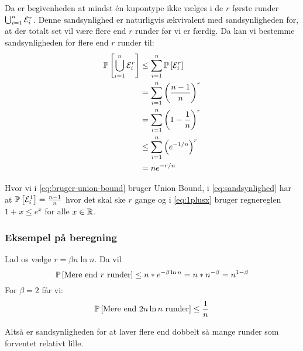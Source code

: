 Da er begivenheden at mindst én kupontype ikke vælges i de $r$ første runder $\bigcup_{i=1}^n \event_i^r$. Denne sandsynlighed er naturligvis ækvivalent med sandsynligheden for, at der totalt set vil være flere end $r$ runder før vi er færdig. Da kan vi bestemme sandsynligheden for flere end $r$ runder til:
\begin{align}
  \P{\bigcup_{i=1}^n \event_i^r}
  &\leq \sum_{i=1}^n \P{\event_i^r} \label{eq:bruger-union-bound} \\
  &= \sum_{i=1}^n \pfrac{n-1}{n}^r \label{eq:sandsynlighed} \\
  &= \sum_{i=1}^n \p{1 - \frac{1}{n}}^r \nonumber \\
  &\leq \sum_{i=1}^n \p{e^{-1/n}}^r \label{eq:1plusx}\\
  &= n e^{-r/n} \nonumber
\end{align}

Hvor vi i \cref{eq:bruger-union-bound} bruger Union Bound, i \cref{eq:sandsynlighed} har at $\P{\event_i^1} = \frac{n-1}{n}$ hvor det skal ske $r$ gange og i \cref{eq:1plusx} bruger regnereglen $1 + x \leq e^x$ for alle $x \in \R$.


\subsubsection{Eksempel på beregning}
Lad os vælge $r = \beta n \ln n$. Da vil
$$
\P{\text{Mere end $r$ runder}} \leq n * e^{- \beta \ln n} = n * n^{- \beta} = n^{1 - \beta}
$$
For $\beta = 2$ får vi:
$$
\P{\text{Mere end $2 n \ln n$ runder}} \leq \frac{1}{n}
$$

Altså er sandsynligheden for at laver flere end dobbelt så mange runder som forventet relativt lille.
